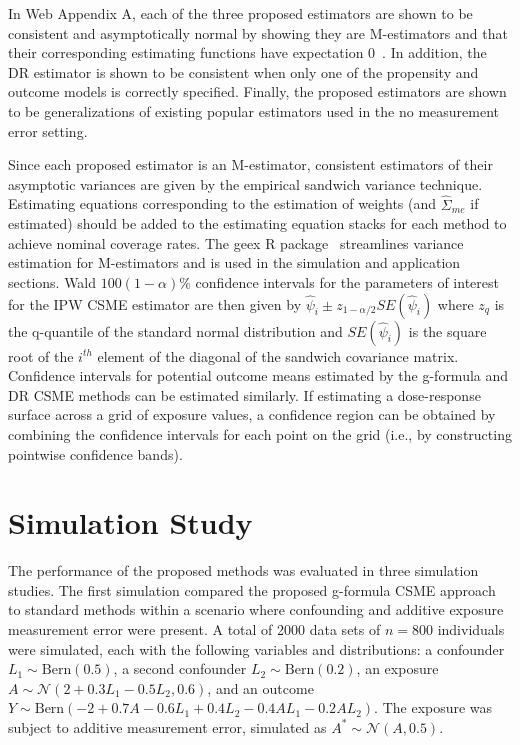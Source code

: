 \documentclass[useAMS,usenatbib,referee]{biom}
\begin{document}
In Web Appendix A, each of the three proposed estimators are shown to be consistent and asymptotically normal by showing they are M-estimators and that their corresponding estimating functions have expectation 0~\citep{stefanski2002}. In addition, the DR estimator is shown to be consistent when only one of the propensity and outcome models is correctly specified. Finally, the proposed estimators are shown to be generalizations of existing popular estimators used in the no measurement error setting.

Since each proposed estimator is an M-estimator, consistent estimators of their asymptotic variances are given by the empirical sandwich variance technique. Estimating equations corresponding to the estimation of weights (and $\hat{\Sigma}_{me}$ if estimated) should be added to the estimating equation stacks for each method to achieve nominal coverage rates. The geex R package~\citep{saul2017} streamlines variance estimation for M-estimators and is used in the simulation and application sections. Wald $100(1-\alpha)\%$ confidence intervals for the parameters of interest for the IPW CSME estimator are then given by $\hat{\psi}_{i} \pm z_{1-\alpha/2} SE(\hat{\psi}_{i})$ where $z_q$ is the q-quantile of the standard normal distribution and $SE(\hat{\psi}_{i})$ is the square root of the $i^{th}$ element of the diagonal of the sandwich covariance matrix. Confidence intervals for potential outcome means estimated by the g-formula and DR CSME methods can be estimated similarly. If estimating a dose-response surface across a grid of exposure values, a confidence region can be obtained by combining the confidence intervals for each point on the grid (i.e., by constructing pointwise confidence bands).

\section{Simulation Study}

The performance of the proposed methods was evaluated in three simulation studies. The first simulation compared the proposed g-formula CSME approach to standard methods within a scenario where confounding and additive exposure measurement error were present. A total of 2000 data sets of $n = 800$ individuals were simulated, each with the following variables and distributions: a confounder $L_{1} \sim \text{Bern}(0.5)$, a second confounder $L_{2} \sim \text{Bern}(0.2)$, an exposure $A \sim \mathcal{N}(2 + 0.3L_{1} - 0.5L_{2}, 0.6)$, and an outcome $Y \sim \text{Bern}(-2 + 0.7A - 0.6L_{1} + 0.4L_{2} - 0.4AL_{1} - 0.2AL_{2})$. The exposure was subject to additive measurement error, simulated as $A^{*} \sim \mathcal{N}(A, 0.5)$.
\end{document}
